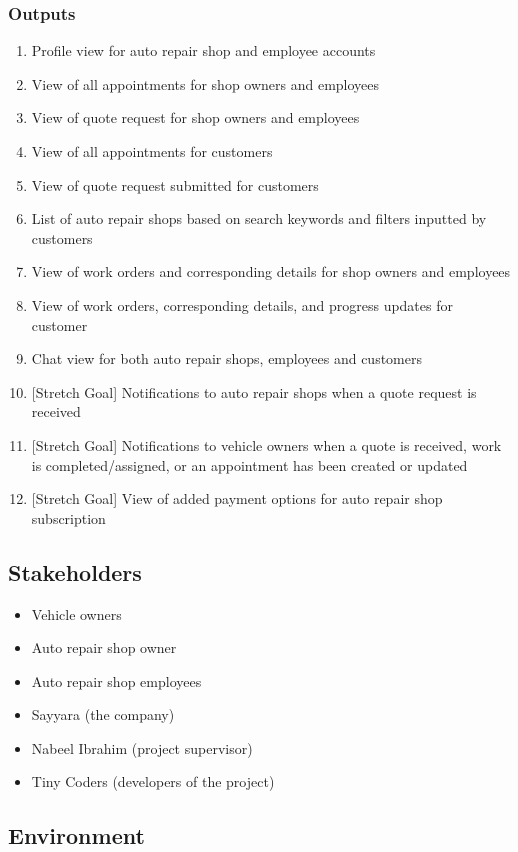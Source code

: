 \documentclass{article}
\begin{document}
\subsubsection{Outputs}
\begin{enumerate}
	\item Profile view for auto repair shop and employee accounts
	\item View of all appointments for shop owners and employees
	\item View of quote request for shop owners and employees
	\item View of all appointments for customers
	\item View of quote request submitted for customers
	\item List of auto repair shops based on search keywords and filters inputted by customers
	\item View of work orders and corresponding details for shop owners and employees
	\item View of work orders, corresponding details, and progress updates for customer
	\item Chat view for both auto repair shops, employees and customers
	\item {[Stretch Goal]} Notifications to auto repair shops when a quote request is received
	\item {[Stretch Goal]} Notifications to vehicle owners when a quote is received, work is completed/assigned,
	      or an appointment has been created or updated
	\item {[Stretch Goal]} View of added payment options for auto repair shop subscription
\end{enumerate}

\subsection{Stakeholders}
\begin{itemize}
	\item Vehicle owners
	\item Auto repair shop owner
	\item Auto repair shop employees
	\item Sayyara (the company)
	\item Nabeel Ibrahim (project supervisor)
	\item Tiny Coders (developers of the project)
\end{itemize}

\subsection{Environment}
\end{document}
